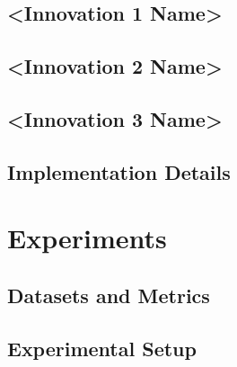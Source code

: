 \documentclass{article}
\begin{document}
\subsection{<Innovation 1 Name>}
\label{sec:method-innov1}


\subsection{<Innovation 2 Name>}
\label{sec:method-innov2}


\subsection{<Innovation 3 Name>}
\label{sec:method-innov3}


\subsection{Implementation Details}
\label{sec:method-impl}



\section{Experiments}
\label{sec:experiments}

\subsection{Datasets and Metrics}
\label{sec:exp-data}

\subsection{Experimental Setup}
\label{sec:exp-setup}
\end{document}
